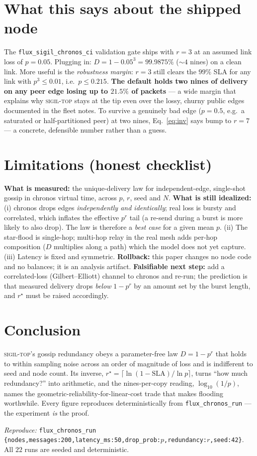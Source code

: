 \documentclass[10pt,twocolumn]{article}
\begin{document}
\section{What this says about the shipped node}
The \texttt{flux\_sigil\_chronos\_ci} validation gate ships with
$r=3$ at an assumed link loss of $p=0.05$. Plugging in: $D=1-0.05^3=99.9875\%$
($\sim\!4$ nines) on a clean link. More useful is the \emph{robustness margin}:
$r=3$ still clears the $99\%$ SLA for any link with $p^3\le 0.01$, i.e.\
$p\le 0.215$. \textbf{The default holds two nines of delivery on any peer edge
losing up to $21.5\%$ of packets} --- a wide margin that explains why
\textsc{sigil-top} stays at the tip even over the lossy, churny public edges
documented in the fleet notes. To survive a genuinely bad edge ($p=0.5$, e.g.\ a
saturated or half-partitioned peer) at two nines, Eq.~\eqref{eq:inv} says bump to
$r=7$ --- a concrete, defensible number rather than a guess.

\section{Limitations (honest checklist)}
\textbf{What is measured:} the unique-delivery law for independent-edge,
single-shot gossip in chronos virtual time, across $p$, $r$, seed and $N$.
\textbf{What is still idealized:} (i) chronos drops edges \emph{independently and
identically}; real loss is bursty and correlated, which inflates the effective
$p^{r}$ tail (a re-send during a burst is more likely to also drop). The law is
therefore a \emph{best case} for a given mean $p$. (ii) The star-flood is
single-hop; multi-hop relay in the real mesh adds per-hop composition
($D$ multiplies along a path) which the model does not yet capture. (iii) Latency
is fixed and symmetric. \textbf{Rollback:} this paper changes no node code and no
balances; it is an analysis artifact. \textbf{Falsifiable next step:} add a
correlated-loss (Gilbert--Elliott) channel to chronos and re-run; the prediction
is that measured delivery drops \emph{below} $1-p^r$ by an amount set by the burst
length, and $r^{\star}$ must be raised accordingly.

\section{Conclusion}
\textsc{sigil-top}'s gossip redundancy obeys a parameter-free law $D=1-p^r$ that
holds to within sampling noise across an order of magnitude of loss and is
indifferent to seed and node count. Its inverse, $r^{\star}=\lceil\ln(1-\mathrm{SLA})/\ln p\rceil$,
turns ``how much redundancy?'' into arithmetic, and the nines-per-copy reading,
$\log_{10}(1/p)$, names the geometric-reliability-for-linear-cost trade that
makes flooding worthwhile. Every figure reproduces deterministically from
\texttt{flux\_chronos\_run} --- the experiment \emph{is} the proof.

\small\vspace{0.5em}\noindent\textit{Reproduce:} \texttt{flux\_chronos\_run \{nodes,messages:200,latency\_ms:50,drop\_prob:$p$,redundancy:$r$,seed:42\}}.
All $22$ runs are seeded and deterministic.
\end{document}
